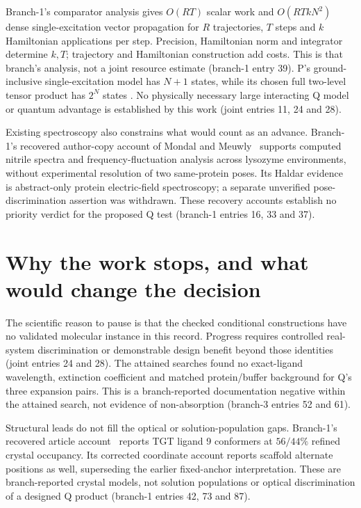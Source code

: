 \documentclass{article}
\begin{document}
Branch-1's comparator analysis gives \(O(RT)\) scalar work and \(O(RTkN^2)\) dense single-excitation vector propagation for \(R\) trajectories, \(T\) steps and \(k\) Hamiltonian applications per step. Precision, Hamiltonian norm and integrator determine \(k,T\); trajectory and Hamiltonian construction add costs. This is that branch's analysis, not a joint resource estimate (branch-1 entry 39). P's ground-inclusive single-excitation model has \(N+1\) states, while its chosen full two-level tensor product has \(2^N\) states \cite{P}. No physically necessary large interacting Q model or quantum advantage is established by this work (joint entries 11, 24 and 28).

Existing spectroscopy also constrains what would count as an advance. Branch-1's recovered author-copy account of Mondal and Meuwly~\cite{Mondal} supports computed nitrile spectra and frequency-fluctuation analysis across lysozyme environments, without experimental resolution of two same-protein poses. Its Haldar evidence~\cite{Haldar} is abstract-only protein electric-field spectroscopy; a separate unverified pose-discrimination assertion was withdrawn. These recovery accounts establish no priority verdict for the proposed Q test (branch-1 entries 16, 33 and 37).

\section{Why the work stops, and what would change the decision}

The scientific reason to pause is that the checked conditional constructions have no validated molecular instance in this record. Progress requires controlled real-system discrimination or demonstrable design benefit beyond those identities (joint entries 24 and 28). The attained searches found no exact-ligand wavelength, extinction coefficient and matched protein/buffer background for Q's three expansion pairs. This is a branch-reported documentation negative within the attained search, not evidence of non-absorption (branch-3 entries 52 and 61).

Structural leads do not fill the optical or solution-population gaps. Branch-1's recovered article account~\cite{Ehrmann} reports TGT ligand 9 conformers at \(56/44\%\) refined crystal occupancy. Its corrected coordinate account reports scaffold alternate positions as well, superseding the earlier fixed-anchor interpretation. These are branch-reported crystal models, not solution populations or optical discrimination of a designed Q product (branch-1 entries 42, 73 and 87).
\end{document}

